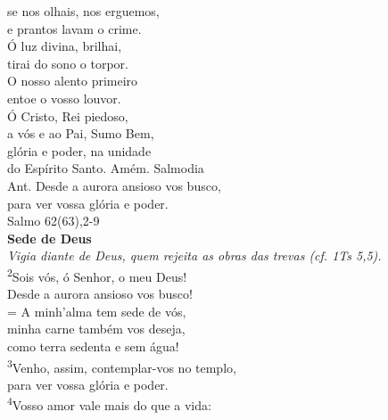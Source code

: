 \documentclass[opennany]{book}
\begin{document}
\begin{center}
    se nos olhais, nos erguemos, \\
    e prantos lavam o crime.
    \vspace{.2cm} \\
    Ó luz divina, brilhai, \\
    tirai do sono o torpor. \\
    O nosso alento primeiro \\
    entoe o vosso louvor.
    \vspace{.2cm} \\
    Ó Cristo, Rei piedoso, \\
    a vós e ao Pai, Sumo Bem, \\
    glória e poder, na unidade \\
    do Espírito Santo. Amém.
    \newpage
    \textcolor{VioletRed2}{Salmodia}
    \vspace{.2cm} \\
    \textcolor{VioletRed2}{Ant.} Desde a aurora ansioso vos busco, \\
    para ver vossa glória e poder.
    \vspace{.2cm} \\
    \textcolor{VioletRed2}{Salmo 62(63),2-9}
    \vspace{.2cm} \\
    \textbf{Sede de Deus} \\
    \textit{Vigia diante de Deus, quem rejeita as obras das trevas (cf. 1Ts 5,5).}
    \vspace{.2cm} \\
    \textsuperscript{\underline{\hspace{.06in}}\textcolor{VioletRed2}{2}}Sois vós, ó Senhor, o meu Deus! \textsuperscript{\gresixstar{}} \\
    Desde a aurora ansioso vos busco! \\
    = A minh'alma tem sede de vós, \dag{} \\
    minha carne também vos deseja, \textsuperscript{\gresixstar{}} \\
    como terra sedenta e sem água!
    \vspace{.2cm} \\
    \textsuperscript{\underline{\hspace{.06in}}\textcolor{VioletRed2}{3}}Venho, assim, contemplar-vos no templo, \textsuperscript{\gresixstar{}} \\
    para ver vossa glória e poder. \\
    \textsuperscript{\underline{\hspace{.06in}}\textcolor{VioletRed2}{4}}Vosso amor vale mais do que a vida: \textsuperscript{\gresixstar{}} \\

\end{center}
\end{document}
